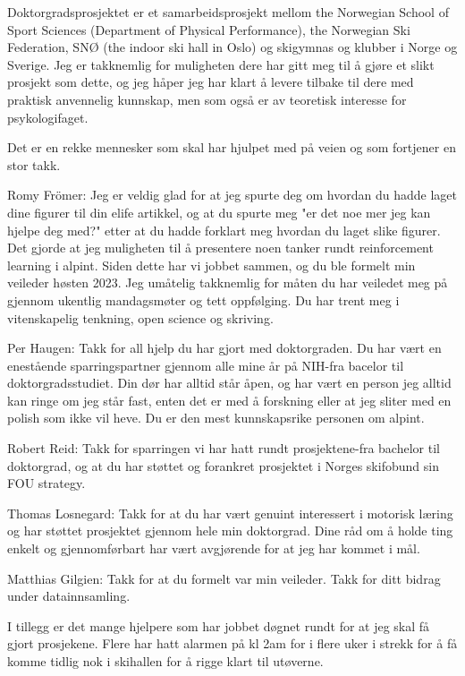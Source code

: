 
Doktorgradsprosjektet er et samarbeidsprosjekt mellom the Norwegian School of Sport Sciences (Department of Physical Performance), the Norwegian Ski Federation, SNØ (the indoor ski hall in Oslo) og skigymnas og klubber i Norge og Sverige. Jeg er takknemlig for muligheten dere har gitt meg til å gjøre et slikt prosjekt som dette, og jeg håper jeg har klart å levere tilbake til dere med praktisk anvennelig kunnskap, men som også er av teoretisk interesse for psykologifaget. 

Det er en rekke mennesker som skal har hjulpet med på veien og som fortjener en stor takk.

Romy Frömer: Jeg er veldig glad for at jeg spurte deg om hvordan du hadde laget dine figurer til din elife artikkel, og at du spurte meg "er det noe mer jeg kan hjelpe deg med?" etter at du hadde forklart meg hvordan du laget slike figurer. Det gjorde at jeg muligheten til å presentere noen tanker rundt reinforcement learning i alpint. Siden dette har vi jobbet sammen, og du ble formelt min veileder høsten 2023. Jeg umåtelig takknemlig for måten du har veiledet meg på gjennom ukentlig mandagsmøter og tett oppfølging. Du har trent meg i vitenskapelig tenkning, open science og skriving.  

Per Haugen: Takk for all hjelp du har gjort med doktorgraden. Du har vært en enestående sparringspartner gjennom alle mine år på NIH-fra bacelor til doktorgradsstudiet. Din dør har alltid står åpen, og har vært en person jeg alltid kan ringe om jeg står fast, enten det er med å forskning eller at jeg sliter med en polish som ikke vil heve. Du er den mest kunnskapsrike personen om alpint. 

Robert Reid: Takk for sparringen vi har hatt rundt prosjektene-fra bachelor til doktorgrad, og at du har støttet og forankret prosjektet i Norges skifobund sin FOU strategy. 

Thomas Losnegard: Takk for at du har vært genuint interessert i motorisk læring og har støttet prosjektet gjennom hele min doktorgrad. Dine råd om å holde ting enkelt og gjennomførbart har vært avgjørende for at jeg har kommet i mål. 

Matthias Gilgien: Takk for at du formelt var min veileder. Takk for ditt bidrag under datainnsamling. 


I tillegg er det mange hjelpere som har jobbet døgnet rundt for at jeg skal få gjort prosjekene. Flere har hatt alarmen på kl 2am  for i flere uker i strekk for å få komme tidlig nok i skihallen for å rigge klart til utøverne. 

